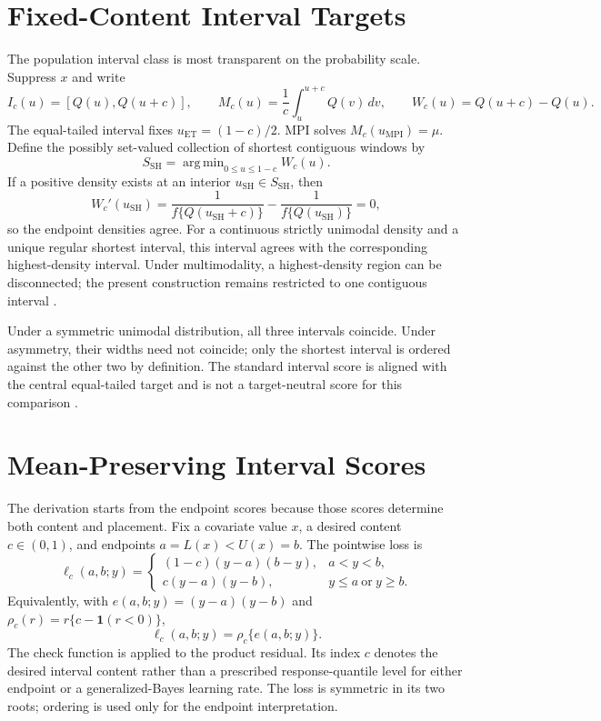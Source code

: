 \documentclass[11pt]{article}
\newcommand{\ind}{\mathbf{1}}
\DeclareMathOperator{\argmin}{arg\,min}
\begin{document}
\section{Fixed-Content Interval Targets}
\label{sec:supp-interval-functionals}

The population interval class is most transparent on the probability scale.
Suppress \(x\) and write
\[
I_c(u)=[Q(u),Q(u+c)],\qquad
M_c(u)=\frac{1}{c}\int_u^{u+c}Q(v)\,dv,\qquad
W_c(u)=Q(u+c)-Q(u).
\]
The equal-tailed interval fixes \(u_{\mathrm{ET}}=(1-c)/2\). MPI
solves \(M_c(u_{\mathrm{MPI}})=\mu\). Define the possibly set-valued collection
of shortest contiguous windows by
\[
S_{\mathrm{SH}}
=\argmin_{0\le u\le1-c}W_c(u).
\]
If a positive density exists at an interior \(u_{\mathrm{SH}}\in
S_{\mathrm{SH}}\), then
\[
W_c'(u_{\mathrm{SH}})
=\frac{1}{f\{Q(u_{\mathrm{SH}}+c)\}}
-\frac{1}{f\{Q(u_{\mathrm{SH}})\}}=0,
\]
so the endpoint densities agree. For a continuous strictly unimodal density
and a unique regular shortest interval, this interval agrees with the
corresponding highest-density interval. Under multimodality, a highest-density
region can be disconnected; the present construction remains restricted to
one contiguous interval
\citep{BrehmerGneiting2021Intervals}.

Under a symmetric unimodal distribution, all three intervals coincide. Under
asymmetry, their widths need not coincide; only the shortest interval is
ordered against the other two by definition. The standard interval score is
aligned with the central equal-tailed target and is not a target-neutral score
for this comparison
\citep{GneitingRaftery2007,BrehmerGneiting2021Intervals,
FisslerEtAl2021SetValued}.

\section{Mean-Preserving Interval Scores}
\label{sec:supp-population-target}

The derivation starts from the endpoint scores because those scores determine
both content and placement. Fix a covariate value \(x\), a desired content
\(c\in(0,1)\), and endpoints
\(a=L(x)<U(x)=b\). The pointwise loss is
\begin{equation}
\ell_c(a,b;y)
=
\begin{cases}
(1-c)(y-a)(b-y), & a<y<b,\\
c(y-a)(y-b), & y\le a\ \text{or}\ y\ge b.
\end{cases}
\label{eq:supp-mpi-loss-piecewise}
\end{equation}
Equivalently, with
\(e(a,b;y)=(y-a)(y-b)\) and
\(\rho_c(r)=r\{c-\ind(r<0)\}\),
\begin{equation}
\ell_c(a,b;y)=\rho_c\{e(a,b;y)\}.
\label{eq:supp-mpi-product-check}
\end{equation}
The check function is applied to the product residual. Its index \(c\) denotes
the desired interval content rather than a prescribed response-quantile level
for either endpoint or a generalized-Bayes learning rate. The loss is symmetric
in its two roots; ordering is used only for the endpoint interpretation.
\end{document}
